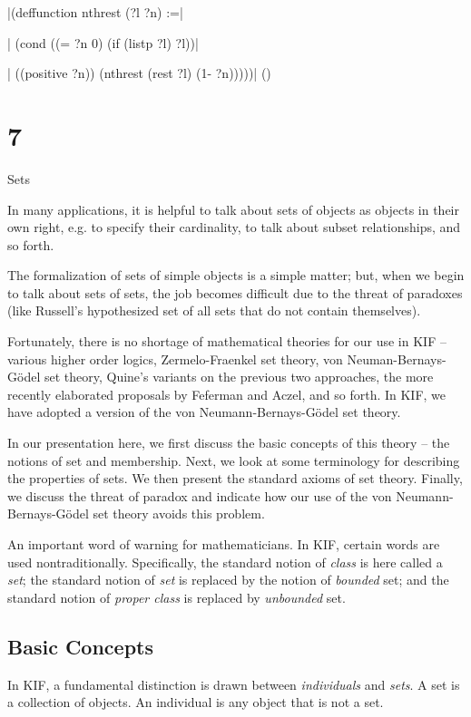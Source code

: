 \medskip
\verbatim|(deffunction nthrest (?l ?n) :=|\par
\verbatim|  (cond ((= ?n 0) (if (listp ?l) ?l))|\par
\verbatim|        ((positive ?n)) (nthrest (rest ?l) (1- ?n)))))|
\hfill(\equation)\par

\vfill\eject

\chapter{7}{Sets}

In many applications, it is helpful to talk about sets of objects as
objects in their own right, e.g. to specify their cardinality, to talk
about subset relationships, and so forth.

The formalization of sets of simple objects is a simple matter; but,
when we begin to talk about sets of sets, the job becomes difficult
due to the threat of paradoxes (like Russell's hypothesized set of all sets
that do not contain themselves).

Fortunately, there is no shortage of mathematical theories for our use in KIF
-- various higher order logics, Zermelo-Fraenkel set theory, von
Neuman-Bernays-G\"odel set theory, Quine's variants on the previous two
approaches, the more recently elaborated proposals by Feferman and Aczel, and so
forth.  In KIF, we have adopted a version of the von Neumann-Bernays-G\"odel
set theory.

In our presentation here, we first discuss the basic concepts of this
theory -- the notions of set and membership.  Next, we look at some
terminology for describing the properties of sets.  We then present the
standard axioms of set theory.  Finally, we discuss the threat of paradox
and indicate how our use of the von Neumann-Bernays-G\"odel set theory avoids
this problem.

An important word of warning for mathematicians.  In KIF, certain words are
used nontraditionally.  Specifically, the standard notion of {\it class} is
here called a {\it set}; the standard notion of {\it set} is replaced by the notion
of {\it bounded} set; and the standard notion of {\it proper class} is replaced by
{\it unbounded} set.

\section{Basic Concepts}

In KIF, a fundamental distinction is drawn between {\it individuals} and
{\it sets}.  A set is a collection of objects.  An individual is any object that
is not a set.  

